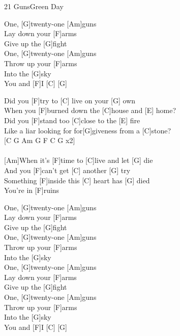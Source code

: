 \begin{song}{21 Guns}{Green Day}
    \begin{chorus}
        [C]One, [G]twenty-one [Am]guns \\
        [G]Lay down your [F]arms \\
        [C]Give up the [G]fight \\
        [C]One, [G]twenty-one [Am]guns \\
        [G]Throw up your [F]arms \\
        [C] Into the [G]sky \\
        You and [F]I [C] [G] 
    \end{chorus}
        
    \begin{bridge}
        [Am]Did you [F]try to [C] live on your [G] own \\
        [Am]When you [F]burned down the [C]house and [E] home? \\
        [Am]Did you [F]stand too [C]close to the [E] fire \\
        [F]Like a liar looking for for[G]giveness from a [C]stone? \\
        
        [C G Am G F C G x2] \\
        [F C E] \\
        [Am F C G x2]
        
        [Am]When it's [F]time to [C]live and let [G] die \\
        [Am]And you [F]can't get [C] another [G] try \\
        [Am]Something [F]inside this [C] heart has [G] died \\
        You're in [F]ruins
    \end{bridge}
        
    \begin{chorus}
        [C]One, [G]twenty-one [Am]guns \\
        [G]Lay down your [F]arms \\
        [C]Give up the [G]fight \\
        [C]One, [G]twenty-one [Am]guns \\
        [G]Throw up your [F]arms \\
        [C] Into the [G]sky \\
        [C]One, [G]twenty-one [Am]guns \\
        [G]Lay down your [F]arms \\
        [C]Give up the [G]fight \\
        [C]One, [G]twenty-one [Am]guns \\
        [G]Throw up your [F]arms \\
        [C] Into the [G]sky \\
        You and [F]I [C] [G]
    \end{chorus}

\end{song}
